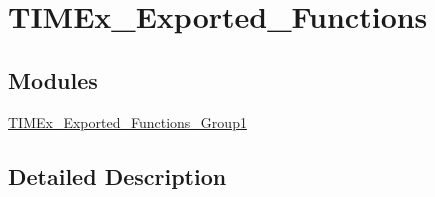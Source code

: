 \hypertarget{group___t_i_m_ex___exported___functions}{\section{T\-I\-M\-Ex\-\_\-\-Exported\-\_\-\-Functions}
\label{group___t_i_m_ex___exported___functions}
}
\subsection*{Modules}
\begin{DoxyCompactItemize}
\item 
\hyperlink{group___t_i_m_ex___exported___functions___group1}{T\-I\-M\-Ex\-\_\-\-Exported\-\_\-\-Functions\-\_\-\-Group1}
\end{DoxyCompactItemize}


\subsection{Detailed Description}
